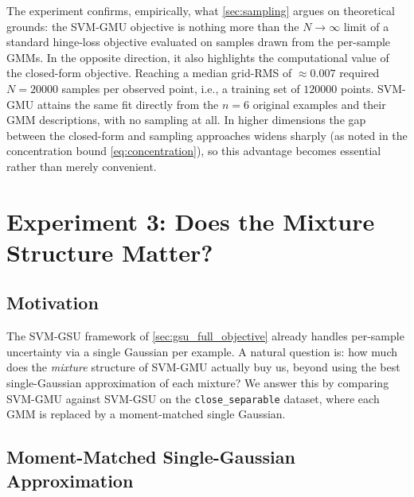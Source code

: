\documentclass[11pt, letterpaper]{article}
\begin{document}
The experiment confirms, empirically, what \cref{sec:sampling} argues on theoretical grounds: the SVM-GMU objective is nothing more than the $N \to \infty$ limit of a standard hinge-loss objective evaluated on samples drawn from the per-sample GMMs. In the opposite direction, it also highlights the computational value of the closed-form objective. Reaching a median grid-RMS of $\approx 0.007$ required $N = 20000$ samples per observed point, i.e., a training set of $120000$ points. SVM-GMU attains the same fit directly from the $n = 6$ original examples and their GMM descriptions, with no sampling at all. In higher dimensions the gap between the closed-form and sampling approaches widens sharply (as noted in the concentration bound \cref{eq:concentration}), so this advantage becomes essential rather than merely convenient.

\section{Experiment 3: Does the Mixture Structure Matter?}\label{sec:exp_gmu_vs_gsu}

\subsection{Motivation}

The SVM-GSU framework of \cref{sec:gsu_full_objective} already handles per-sample uncertainty via a single Gaussian per example. A natural question is: how much does the \emph{mixture} structure of SVM-GMU actually buy us, beyond using the best single-Gaussian approximation of each mixture? We answer this by comparing SVM-GMU against SVM-GSU on the \texttt{close\_separable} dataset, where each GMM is replaced by a moment-matched single Gaussian.

\subsection{Moment-Matched Single-Gaussian Approximation}\label{sec:exp_moment_match}
\end{document}
